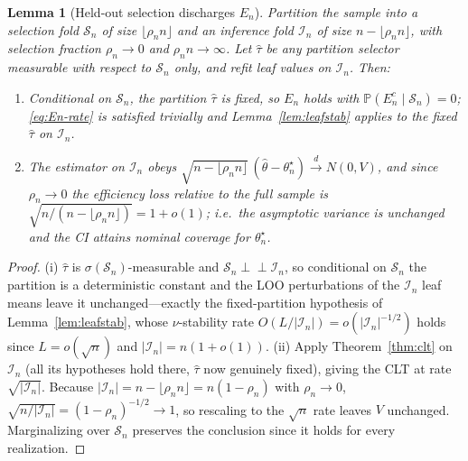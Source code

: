 \documentclass[11pt]{article}
\theoremstyle{plain}
\newtheorem{lemma}{Lemma}
\theoremstyle{definition}
\theoremstyle{remark}
\newcommand{\PP}{\mathbb{P}}
\newcommand{\indep}{\perp\!\!\!\perp}
\newcommand{\thstar}{\theta^{\star}_n}
\newcommand{\htheta}{\hat\theta}
\newcommand{\odiff}{o}
\begin{document}
\begin{lemma}[Held-out selection discharges $E_n$]\label{lem:routeA}
Partition the sample into a selection fold $\mathcal S_n$ of size $\lfloor\rho_n
n\rfloor$ and an inference fold $\mathcal I_n$ of size $n-\lfloor\rho_n n\rfloor$,
with selection fraction $\rho_n\to0$ and $\rho_n n\to\infty$. Let $\hat\tau$ be
\emph{any} partition selector measurable with respect to $\mathcal S_n$ only, and
refit leaf values on $\mathcal I_n$. Then:
\begin{enumerate}
  \item[(i)] Conditional on $\mathcal S_n$, the partition $\hat\tau$ is fixed, so
  $E_n$ holds with $\PP(E_n^c\mid\mathcal S_n)=0$; \eqref{eq:En-rate} is satisfied
  trivially and Lemma~\ref{lem:leafstab} applies to the fixed $\hat\tau$ on
  $\mathcal I_n$.
  \item[(ii)] The estimator on $\mathcal I_n$ obeys
  $\sqrt{n-\lfloor\rho_n n\rfloor}\,(\htheta-\thstar)\xrightarrow{d}N(0,V)$, and
  since $\rho_n\to0$ the efficiency loss relative to the full sample is
  $\sqrt{n/(n-\lfloor\rho_n n\rfloor)}=1+\odiff(1)$; i.e.\ the asymptotic
  variance is unchanged and the CI attains nominal coverage for $\thstar$.
\end{enumerate}
\end{lemma}

\begin{proof}
(i) $\hat\tau$ is $\sigma(\mathcal S_n)$-measurable and $\mathcal S_n\indep
\mathcal I_n$, so conditional on $\mathcal S_n$ the partition is a deterministic
constant and the LOO perturbations of the $\mathcal I_n$ leaf means leave it
unchanged---exactly the fixed-partition hypothesis of Lemma~\ref{lem:leafstab},
whose $\nu$-stability rate $O(L/|\mathcal I_n|)=\odiff(|\mathcal I_n|^{-1/2})$
holds since $L=\odiff(\sqrt n)$ and $|\mathcal I_n|=n(1+\odiff(1))$.
(ii) Apply Theorem~\ref{thm:clt} on $\mathcal I_n$ (all its hypotheses hold there,
$\hat\tau$ now genuinely fixed), giving the CLT at rate
$\sqrt{|\mathcal I_n|}$. Because $|\mathcal I_n|=n-\lfloor\rho_n n\rfloor
=n(1-\rho_n)$ with $\rho_n\to0$, $\sqrt{n/|\mathcal I_n|}=(1-\rho_n)^{-1/2}\to1$,
so rescaling to the $\sqrt n$ rate leaves $V$ unchanged. Marginalizing over
$\mathcal S_n$ preserves the conclusion since it holds for every realization.
\end{proof}
\end{document}

